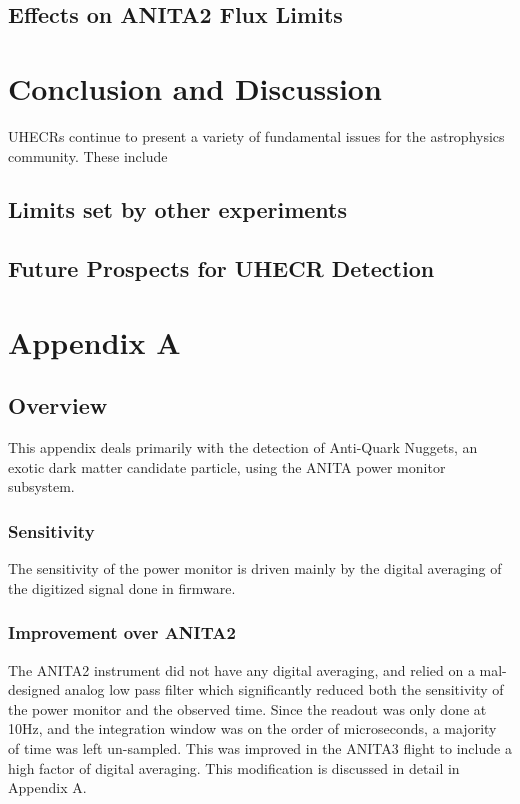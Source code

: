 \section{Effects on ANITA2 Flux Limits}
			
			
\chapter{Conclusion and Discussion}
	UHECRs continue to present a variety of fundamental issues for the astrophysics community.  These include 
\section{Limits set by other experiments}

\section{Future Prospects for UHECR Detection}


	
			
			

			
\chapter{Appendix A}
\section{Overview}
	This appendix deals primarily with the detection of Anti-Quark Nuggets, an exotic dark matter candidate particle, using the ANITA power monitor subsystem.
	
	
	\subsection{Sensitivity}
		The sensitivity of the power monitor is driven mainly by the digital averaging of the digitized signal done in firmware.
	\subsection{Improvement over ANITA2}
		The ANITA2 instrument did not have any digital averaging, and relied on a mal-designed analog low pass filter which significantly reduced both the sensitivity of the power monitor and the observed time.  Since the readout was only done at 10Hz, and the integration window was on the order of microseconds, a majority of time was left un-sampled.  This was improved in the ANITA3 flight to include a high factor of digital averaging.  This modification is discussed in detail in Appendix A.
	
	
	

